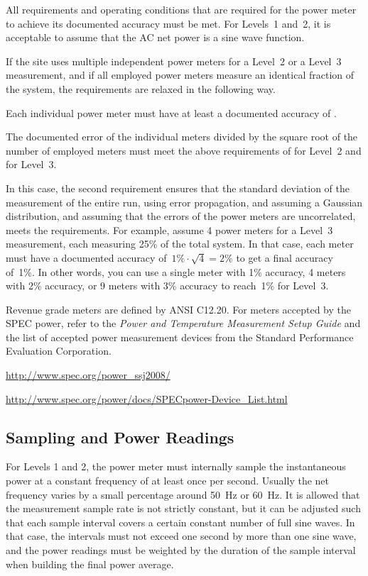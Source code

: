 \noindent
All requirements and operating conditions that are required for the power meter to achieve its documented accuracy must be met.
For Levels~1 and~2, it is acceptable to assume that the AC net power is a sine wave function.
\wl

\noindent
If the site uses multiple independent power meters for a Level~2 or a Level~3 measurement, and if all employed power meters measure an identical fraction of the system, the requirements are relaxed in the following way.
\begin{packed_item}
\item 
Each individual power meter must have at least a documented accuracy of \SpecAccuracyMeter{}.
\item
The documented error of the individual meters divided by the square root of the number of employed meters must meet the above requirements of \SpecAccuracyLTwo{} for Level~2 and \SpecAccuracyLThree{} for Level~3.
\end{packed_item}
In this case, the second requirement ensures that the standard deviation of the measurement of the entire run, using error propagation, and assuming a Gaussian distribution, and assuming that the errors of the power meters are uncorrelated, meets the requirements.
For example, assume 4 power meters for a Level~3 measurement, each measuring 25\% of the total system.
In that case, each meter must have a documented accuracy of~$1\% \cdot \sqrt{4} = 2\%$ to get a final accuracy of~1\%.
In other words, you can use a single meter with 1\% accuracy, 4 meters with 2\% accuracy, or 9 meters with 3\% accuracy to reach~1\% for Level~3.
\wl

\noindent
Revenue grade meters are defined by ANSI C12.20.
For meters accepted by the SPEC power, refer to the {\itshape Power and Temperature Measurement Setup Guide \/} and the list of accepted power measurement devices from the Standard Performance Evaluation Corporation.
\begin{packed_item}
\item 
\url{http://www.spec.org/power_ssj2008/}
\item
\url{http://www.spec.org/power/docs/SPECpower-Device_List.html }
\end{packed_item}
\wl

\subsection{Sampling and Power Readings}
\noindent
For Levels 1 and 2, the power meter must internally sample the instantaneous power at a constant frequency of at least once per second.
Usually the net frequency varies by a small percentage around 50~Hz or 60~Hz.
It is allowed that the measurement sample rate is not strictly constant, but it can be adjusted such that each sample interval covers a certain constant number of full sine waves.
In that case, the intervals must not exceed one second by more than one sine wave, and the power readings must be weighted by the duration of the sample interval when building the final power average.
\wl

